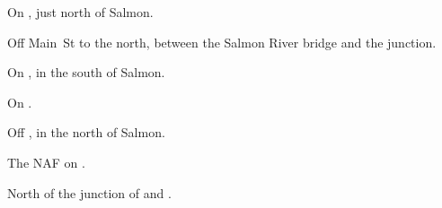 
\begin{LocationList}

On , just north of Salmon.

Off  Main~St to the north, between the Salmon River bridge and the  junction.

On , in the south of Salmon.

On .

\Location{\GarageHQ \Garage}
Off , in the north of Salmon.

\Location{\GasStation \Gas \Rest}
The NAF on .

North of the junction of  and .

\end{LocationList}
